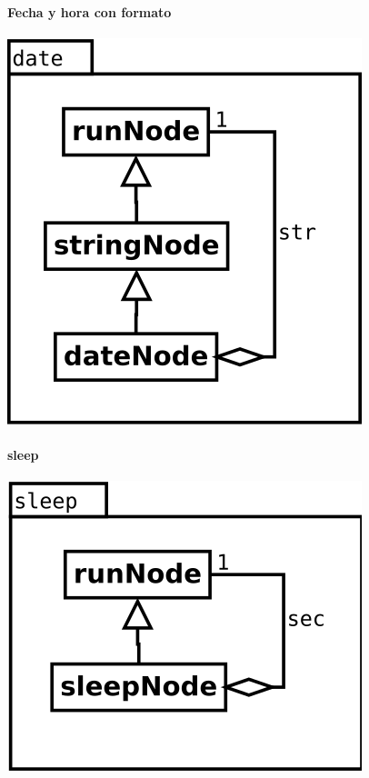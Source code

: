 \begin{multicols}{2}
   \paragraph {Fecha y hora con formato} 
   \begin{center}
   \includegraphics[scale=0.4]{date.png} \\
   \end{center}

   \paragraph {sleep} 
   \begin{center}
   \includegraphics[scale=0.4]{sleep.png} \\
   \end{center}
\end{multicols}

